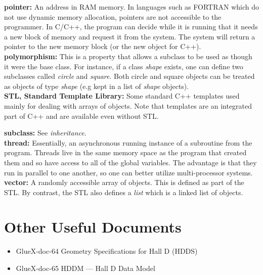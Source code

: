 \documentclass[12pt]{article}
\begin{document}
{\bf pointer:} An address in RAM memory. In languages such as FORTRAN
which do not use dynamic memory allocation, pointers are not accessible
to the programmer. In C/C++, the program can decide while it is running
that it needs a new block of memory and request it from the system.
The system will return a pointer to the new memory block (or the new
object for C++).\\

{\bf polymorphism:} This is a property that allows a subclass to be
used as though it were the base class. For instance, if a class
{\it shape} exists, one can define two subclasses called {\it circle}
and {\it square}. Both circle and square objects can be treated as
objects of type {\it shape} (e.g kept in a list of {\it shape} objects).\\

{\bf STL, Standard Template Library:} Some standard C++ templates used
mainly for dealing with arrays of objects. Note that templates are 
an integrated part of C++ and are available even without STL.

{\bf subclass:} See {\it inheritance}.\\

{\bf thread:} Essentially, an asynchronous running instance of a 
subroutine from the program. Threads live in the same memory
space as the program that created them and so have access to all
of the global variables. The advantage is that they run in parallel
to one another, so one can better utilize multi-processor systems.\\

{\bf vector:} A randomly accessible array of objects. This is defined
as part of the STL. By contrast, the STL also defines a {\it list}
which is a linked list of objects.\\

\section{Other Useful Documents}
\label{documents}

\begin{itemize}
\item{GlueX-doc-64} Geometry Specifications for Hall D (HDDS)
\item{GlueX-doc-65} HDDM --- Hall D Data Model
\end{itemize}
\end{document}

